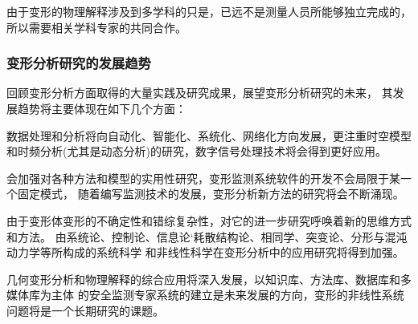 由于变形的物理解释涉及到多学科的只是，已远不是测量人员所能够独立完成的，
所以需要相关学科专家的共同合作。

\subsubsection{变形分析研究的发展趋势}
回顾变形分析方面取得的大量实践及研究成果，展望变形分析研究的未来，
其发展趋势将主要体现在如下几个方面：
\begin{asparaitem}[$\bullet$]
\item 数据处理和分析将向自动化、智能化、系统化、网络化方向发展，更注重时空模型
和时频分析(尤其是动态分析)的研究，数字信号处理技术将会得到更好应用。
\item 会加强对各种方法和模型的实用性研究，变形监测系统软件的开发不会局限于某一个固定模式，
随着编写监测技术的发展，变形分析新方法的研究将会不断涌现。
\item 由于变形体变形的不确定性和错综复杂性，对它的进一步研究呼唤着新的思维方式和方法。
由系统论、控制论、信息论‘耗散结构论、相同学、突变论、分形与混沌动力学等所构成的系统科学
和非线性科学在变形分析中的应用研究将得到加强。
\item 几何变形分析和物理解释的综合应用将深入发展，以知识库、方法库、数据库和多媒体库为主体
的安全监测专家系统的建立是未来发展的方向，变形的非线性系统问题将是一个长期研究的课题。
\end{asparaitem}

